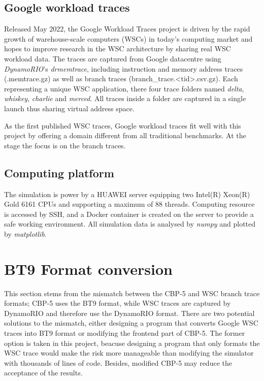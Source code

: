 \subsection{Google workload traces}
Released May 2022, the Google Workload Traces\cite{noauthor_google_nodate} project is driven by the rapid growth of warehouse-scale computers (WSCs) in today's computing market and hopes to improve research in the WSC architecture by sharing real WSC workload data. The traces are captured from Google datacentre using \textit{DynamoRIO}'s \textit{drmemtrace}, including instruction and memory address traces (.memtrace.gz) as well as branch traces (branch\_trace.<tid>.csv.gz). Each representing a unique WSC application, there four trace folders named \textit{delta}, \textit{whiskey}, \textit{charlie} and \textit{merced}. All traces inside a folder are captured in a single launch thus sharing virtual address space.\par\hspace*{\fill}\par

As the first published WSC traces, Google workload traces fit well with this project by offering a domain 
different from all traditional benchmarks. At the stage the focus is on the branch traces.


\subsection{Computing platform}

The simulation is power by a HUAWEI server equipping two Intel(R) Xeon(R) Gold 6161 CPUs and 
supporting a maximum of 88 threads. Computing resource is accessed by SSH, and a Docker container 
is created on the server to provide a safe working environment. All simulation data is analysed by \textit{numpy} and plotted by \textit{matplotlib}. 



\section{BT9 Format conversion}
\label{BT9 Converson}

This section stems from the mismatch between the CBP-5 and WSC branch trace formats; CBP-5 uses the BT9 format, while WSC traces are captured by DynamoRIO and therefore use the DynamoRIO format. There are two potential solutions to the mismatch, either designing a program that converts Google WSC traces into BT9 format or modifying the frontend part of CBP-5. The former option is taken in this project, beacuse designing a program that only formats the WSC trace would make the risk more manageable than modifying the simulator with thousands of lines of code. Besides, modified CBP-5 may reduce the acceptance of the results. \par\hspace*{\fill}\par

